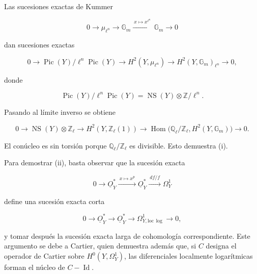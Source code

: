 Las sucesiones exactas de Kummer

\begin{equation*}
0\longrightarrow\mu_{\ell^n}\longrightarrow\mathbb G_m
\xrightarrow{\ x\mapsto x^{\ell^n}\ }\mathbb G_m\longrightarrow0
\end{equation*}

dan sucesiones exactas

\begin{equation*}
0\longrightarrow
\operatorname{Pic}(Y)/\ell^n\operatorname{Pic}(Y)
\longrightarrow H^2(Y,\mu_{\ell^n})
\longrightarrow H^2(Y,\mathbb G_m)_{\ell^n}
\longrightarrow0,
\end{equation*}

donde

\begin{equation*}
\operatorname{Pic}(Y)/\ell^n\operatorname{Pic}(Y)
=\operatorname{NS}(Y)\otimes\mathbb Z/\ell^n.
\end{equation*}

Pasando al límite inverso se obtiene

\begin{equation*}
0\longrightarrow\operatorname{NS}(Y)\otimes\mathbb Z_\ell
\longrightarrow H^2(Y,\mathbb Z_\ell(1))
\longrightarrow
\operatorname{Hom}\bigl(\mathbb Q_\ell/\mathbb Z_\ell,
H^2(Y,\mathbb G_m)\bigr)
\longrightarrow0.
\end{equation*}

El conúcleo es sin torsión porque $\mathbb Q_\ell/\mathbb Z_\ell$ es
divisible. Esto demuestra (i).

Para demostrar (ii), basta observar que la sucesión exacta

\begin{equation*}
0\longrightarrow\underline O_Y^*
\xrightarrow{\ x\mapsto x^p\ }\underline O_Y^*
\xrightarrow{\ df/f\ }\Omega_Y^1
\end{equation*}

define una sucesión exacta corta

\begin{equation*}
0\longrightarrow\underline O_Y^*\longrightarrow\underline O_Y^*
\longrightarrow\Omega^1_{Y,\mathrm{loc}\,\log}\longrightarrow0,
\end{equation*}

y tomar después la sucesión exacta larga de cohomología correspondiente.
Este argumento se debe a Cartier, quien demuestra además que, si $C$
designa el operador de Cartier sobre $H^0(Y,\Omega_Y^1)$, las diferenciales
localmente logarítmicas forman el núcleo de $C-\operatorname{Id}$.

